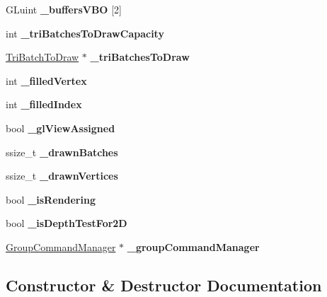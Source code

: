\begin{DoxyCompactItemize}
G\+Luint {\bfseries \+\_\+buffers\+V\+BO} \mbox{[}2\mbox{]}
\item 
\mbox{\label{classRenderer_ac0618b3eff2b1b0201bd939437defe9e}} 
int {\bfseries \+\_\+tri\+Batches\+To\+Draw\+Capacity}
\item 
\mbox{\label{classRenderer_a47aac6ca0ae20e3ac3d968893493140d}} 
\hyperlink{structRenderer_1_1TriBatchToDraw}{Tri\+Batch\+To\+Draw} $\ast$ {\bfseries \+\_\+tri\+Batches\+To\+Draw}
\item 
\mbox{\label{classRenderer_a89594be040a1fa08a33de54811e9b959}} 
int {\bfseries \+\_\+filled\+Vertex}
\item 
\mbox{\label{classRenderer_a5163b213aeb9a848bde0d4b16f5fa6ab}} 
int {\bfseries \+\_\+filled\+Index}
\item 
\mbox{\label{classRenderer_ac0869bd9ed8b26c677f7d969a7ed3e28}} 
bool {\bfseries \+\_\+gl\+View\+Assigned}
\item 
\mbox{\label{classRenderer_a80e80223d5beb747ba1abf56b3c223a1}} 
ssize\+\_\+t {\bfseries \+\_\+drawn\+Batches}
\item 
\mbox{\label{classRenderer_a848749eb6b6f5b90a4b63c7d689cd5aa}} 
ssize\+\_\+t {\bfseries \+\_\+drawn\+Vertices}
\item 
\mbox{\label{classRenderer_a8661e084e6e8480e1902a2e3b3e0bb80}} 
bool {\bfseries \+\_\+is\+Rendering}
\item 
\mbox{\label{classRenderer_a80625eafe3cd54b228cd2b78ce1c8252}} 
bool {\bfseries \+\_\+is\+Depth\+Test\+For2D}
\item 
\mbox{\label{classRenderer_ac8636e608b5ebd386620e9d6a9b0d831}} 
\hyperlink{classGroupCommandManager}{Group\+Command\+Manager} $\ast$ {\bfseries \+\_\+group\+Command\+Manager}
\end{DoxyCompactItemize}


\subsection{Constructor \& Destructor Documentation}
\mbox{\label{classRenderer_a7ebf46f54dab9905f79b80f7fddb76a6}} 
